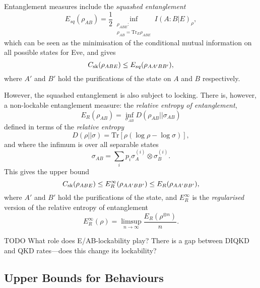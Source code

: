 \documentclass[10pt, a4paper]{article}
\numberwithin{equation}{section} %
\theoremstyle{definition}
\theoremstyle{plain}
\newcommand{\?}{\mathrel{?}} %
\newcommand{\Tr}{\mathrm{Tr}} %
\newcommand{\sk}{\rm sk}
\begin{document}
      Entanglement measures include the \emph{squashed entanglement}
      \begin{equation}
        E_{sq}(\rho_{A B}) = \frac{1}{2} \inf_{\substack{\rho_{A BE} : \\ \rho_{A B} = \Tr_E \rho_{A BE}}} I(A:B|E)_{\rho},
      \end{equation}
      which can be seen as the minimisation of the conditional mutual information on all possible states for Eve, and gives
      \begin{equation}
        C_{\sk}(\rho_{A B E}) \leq E_{sq}(\rho_{A A' B B'}),
      \end{equation}
      where \(A'\) and \(B'\) hold the purifications of the state on \(A\) and \(B\) respectively.

      However, the squashed entanglement is also subject to locking. There is, however, a non-lockable entanglement measure: the \emph{relative entropy of entanglement},  
      \begin{equation}
        E_R\left({\rho_{AB}}\right) = \inf_{\sigma_{AB}} D(\rho_{AB}||\sigma_{AB})
      \end{equation}
      defined in terms of the \emph{relative entropy}
      \begin{equation}
        D(\rho||\sigma) = \Tr\left[ \rho (\log \rho - \log \sigma) \right],
      \end{equation}
      and where the infimum is over all separable states
      \begin{equation}
        \sigma_{AB} = \sum_i p_i \sigma_{A}^{(i)} \otimes \sigma_{B}^{(i)}.
      \end{equation}
      This gives the upper bound
      \begin{equation}
        C_{\sk}(\rho_{A B E}) \leq E_{R}^{\infty}(\rho_{A A' B B'}) \leq E_{R}(\rho_{A A' B B'}),
      \end{equation}
      where \(A'\) and \(B'\) hold the purifications of the state, and \(E_{R}^{\infty}\) is the \emph{regularised} version of the relative entropy of entanglement
      \begin{equation}
        E_{R}^{\infty}(\rho) = \limsup_{n\to\infty} \frac{E_R(\rho^{\otimes n})}{n}.
      \end{equation}

        TODO What role does E/AB-lockability play? There is a gap between DIQKD and QKD rates---does this change its lockability?

      \subsection{Upper Bounds for Behaviours}
\end{document}
